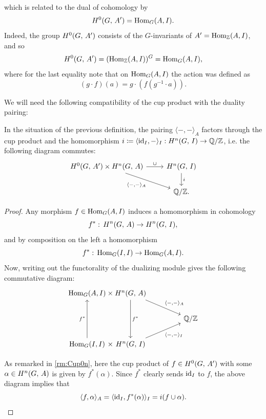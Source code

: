 \documentclass[a4paper, oneside]{memoir}
\begin{document}
which is related to the dual of cohomology by
\[
    H^{0}( G, \, A^{\prime} ) = \operatorname{Hom}_G(A,I).
\]
Indeed, the group \(H^{0}( G, \, A^{\prime}  )\) consists of the \(G\)-invariants of \(A^{\prime} = \operatorname{Hom}_{\mathbb{Z}}(A,I)\), and so
\[
    H^{0}( G, \, A^{\prime} ) = (\operatorname{Hom}_{\mathbb{Z}}(A,I))^G = \operatorname{Hom}_G(A,I),
\]
where for the last equality note that on $\operatorname{Hom}_G(A,I)$ the action was defined as
\[
    (g\cdot f)(a)=g\cdot(f(g^{-1}\cdot a)).
\]

We will need the following compatibility of the cup product with the duality pairing:

\begin{lemma}\label{lm:CompatCupDual}
    In the situation of the previous definition, the pairing \(\langle-,- \rangle_A\) factors through the cup product and the homomorphism \(i\coloneqq \langle \operatorname{id}_I,-\rangle_I: H^{n}( G, \, I )\to \mathbb{Q}/\mathbb{Z}\), i.e. the following diagram commutes:
    \[
        \begin{tikzcd}
            {\H{0}{G}{A^\prime}  \times \H{n}{G}{A}} \ar[swap, rd, "\langle - {,} - \rangle_A "] \ar[r, "\cup"] & \H{n}{G}{I} \ar[d, "i"] \\
            & \Q/\Z.
        \end{tikzcd}
    \]
\end{lemma}

\begin{proof}
    Any morphism \(f\in\operatorname{Hom}_G(A,I)\) induces a homomorphism in cohomology
    \[
        f^*:\, H^{n}( G, \, A )\to H^{n}( G, \, I ),
    \]
    and by composition on the left a homomorphism
    \[
        f^*:\, \operatorname{Hom}_G(I,I)\to\operatorname{Hom}_G(A,I)
        .\]
    Now, writing out the functorality of the dualizing module gives the following commutative diagram:
    \[
        \tikzset{
            symbol/.style={
                    draw=none,
                    every to/.append style={
                            edge node={node [sloped, allow upside down, auto=false]{$#1$}}}
                }
        }
        \begin{tikzcd}
            \Hom_G(A,I) \arrow[r,symbol=\times] &[-2em] \ar[dd, "f^*"] \H{n}{G}{A} \ar[rd, "\langle - {,} - \rangle_A "] &[2em] \\
            && \Q/\Z \\
            \Hom_G(I,I)  \arrow[r,symbol=\times] \ar[uu, "f^*"] & \H{n}{G}{I}  \ar[swap, ru, "\langle - {,} - \rangle_I "]
        \end{tikzcd}
    \]

    As remarked in \ref{rm:Cup0n}, here the cup product of \(f\in H^{0}( G, \, A^{\prime} )\) with some \(\alpha\in H^{n}( G, \, A )\) is given by
    \( f^*(\alpha) \). Since \(f^*\) clearly sends \(\operatorname{id}_I\) to \(f\), the above diagram implies that
    \[
        \langle f, \alpha \rangle_A = \langle \operatorname{id}_I, f^*(\alpha)\rangle_I=i(f\cup\alpha).
    \]
\end{proof}
\end{document}
